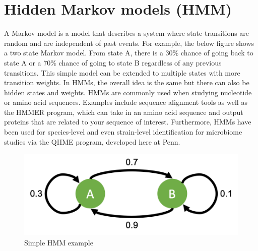 \documentclass[12pt,openany]{book}
\begin{document}
\section{Hidden Markov models (HMM)}\label{hidden-markov-models-hmm}

A Markov model is a model that describes a system where state
transitions are random and are independent of past events. For example,
the below figure shows a two state Markov model. From state A, there is
a 30\% chance of going back to state A or a 70\% chance of going to
state B regardless of any previous transitions. This simple model can be
extended to multiple states with more transition weights. In HMMs, the
overall idea is the same but there can also be hidden states and
weights. HMMs are commonly used when studying nucleotide or amino acid
sequences. Examples include sequence alignment tools as well as the
HMMER program, which can take in an amino acid sequence and output
proteins that are related to your sequence of interest. Furthermore,
HMMs have been used for species-level and even strain-level
identification for microbiome studies via the QIIME program, developed
here at Penn.

\begin{figure}

{\centering \includegraphics[width=0.35\linewidth]{fig/mm_fig} 

}

\caption{Simple HMM example}\label{fig:unnamed-chunk-10}
\end{figure}


\end{document}
